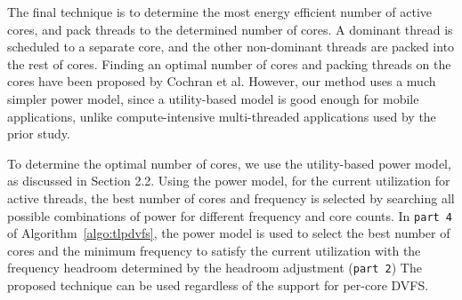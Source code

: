 The final technique is to determine the most energy efficient number of active
cores, and pack threads to the determined number of cores. A dominant thread is
scheduled to a separate core, and the other non-dominant threads are packed 
into the rest of cores. 
Finding an optimal number of cores and packing threads on the cores have been
proposed by Cochran et al. \cite{packandcap}  However, our method uses 
a much simpler power model, since a utility-based model is good enough for
mobile applications, unlike compute-intensive multi-threaded applications used
by the prior study.

To determine the optimal number of cores, we use the utility-based power model, as discussed
in Section 2.2. Using the power model, for the current utilization for active threads,
the best number of cores and frequency is selected by searching all possible combinations
of power for different frequency and core counts. In {\tt part 4} of Algorithm~\ref{algo:tlpdvfs},
the power model is used to select the best number of cores and the minimum frequency 
to satisfy the current utilization with the frequency headroom determined by the headroom
adjustment ({\tt part 2})
The proposed technique can be used regardless of the support for per-core DVFS. 

